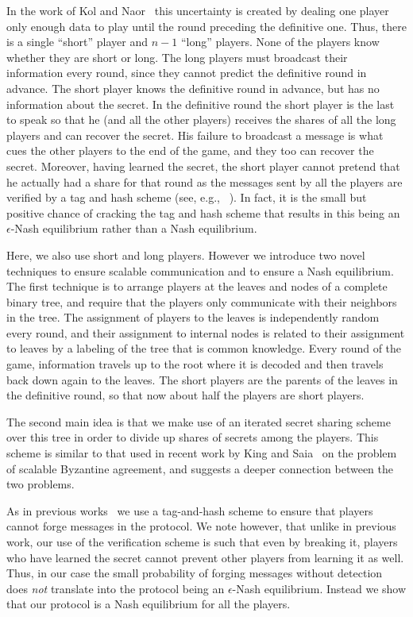 \documentclass[12pt]{article}
\theoremstyle{definition}
\begin{document}
In the work of Kol and Naor~\cite{kol2008games} this uncertainty is
created by dealing one player only enough data to play until the round
preceding the definitive one.  Thus, there is a single ``short''
player and $n-1$ ``long'' players.  None of the players know whether
they are short or long.  The long players must broadcast their
information every round, since they cannot predict the definitive
round in advance. The short player knows the definitive round in
advance, but has no information about the secret. In the definitive
round the short player is the last to speak so that he (and all the
other players) receives the shares of all the long players and can
recover the secret. His failure to broadcast a message is what cues
the other players to the end of the game, and they too can recover the
secret. Moreover, having learned the secret, the short player cannot
pretend that he actually had a share for that round as the messages
sent by all the players are verified by a tag and hash scheme (see,
e.g., ~\cite{wegman1981new,rabin1989verifiable, kol2008games}). In
fact, it is the small but positive chance of cracking the tag and hash
scheme that results in this being an $\epsilon$-Nash equilibrium
rather than a Nash equilibrium.

Here, we also use short and long players. However we introduce two
novel techniques to ensure scalable communication and to ensure a Nash
equilibrium.  The first technique is to arrange players at the leaves
and nodes of a complete binary tree, and require that the players only
communicate with their neighbors in the tree. The assignment of
players to the leaves is independently random every round, and their
assignment to internal nodes is related to their assignment to leaves
by a labeling of the tree that is common knowledge.  Every round of
the game, information travels up to the root where it is decoded and
then travels back down again to the leaves. The short players are the
parents of the leaves in the definitive round, so that now about half
the players are short players.

The second main idea is that we make use of an iterated secret sharing
scheme over this tree in order to divide up shares of secrets among
the players.  This scheme is similar to that used in recent work by
King and Saia~\cite{king2010breaking} on the problem of scalable
Byzantine agreement, and suggests a deeper connection between the two
problems.

As in previous works~\cite{wegman1981new,rabin1989verifiable,
  kol2008games} we use a tag-and-hash scheme to ensure that players
cannot forge messages in the protocol. We note however, that unlike in
previous work, our use of the verification scheme is such that even by
breaking it, players who have learned the secret cannot prevent other
players from learning it as well. Thus, in our case the small
probability of forging messages without detection does \emph{not}
translate into the protocol being an $\epsilon$-Nash equilibrium.
Instead we show that our protocol is a Nash equilibrium for all the
players.
\end{document}
